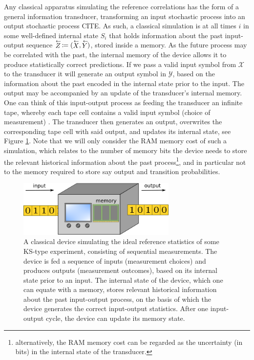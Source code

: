 Any classical apparatus simulating the reference correlations has the form of a general information transducer, transforming an input stochastic process into an output stochastic process CITE. As such, a classical simulation is at all times $i$ in some well-defined internal state $S_i$ that holds information about the past input-output sequence $\oset{\leftarrow}{Z}\thinspace\coloneqq(\oset{\leftarrow}{X},\oset{\leftarrow}{Y})$, stored inside a memory. As the future process may be correlated with the past, the internal memory of the device allows it to produce statistically correct predictions. If we pass a valid input symbol from $\mathcal{X}$ to the transducer it will generate an output symbol in $\mathcal{Y}$, based on the information about the past encoded in the internal state prior to the input. The output may be accompanied by an update of the transducer's internal memory. One can think of this input-output process as feeding the transducer an infinite tape, whereby each tape cell contains a valid input symbol (choice of measurement) . The transducer then generates an output, overwrites the corresponding tape cell with said output, and updates its internal state, see Figure \ref{fig:transducer}. Note that we will only consider the RAM memory cost of such a simulation, which relates to the number of memory bits the device needs to store the relevant historical information about the past process\footnote{alternatively, the RAM memory cost can be regarded as the uncertainty (in bits) in the internal state of the transducer.}, and in particular not to the memory required to store say output and transition probabilities.

\begin{figure}
    \centering
    \includegraphics[width=0.7\textwidth]{images/transducer.png}
    \caption{A classical device simulating the ideal reference statistics of some KS-type experiment, consisting of sequential measurements. The device is fed a sequence of inputs (measurement choices) and produces outputs (measurement outcomes), based on its internal state prior to an input. The internal state of the device, which one can equate with a memory, stores relevant historical information about the past input-output process, on the basis of which the device generates the correct input-output statistics. After one input-output cycle, the device can update its memory state.}
    \label{fig:transducer}
\end{figure}

